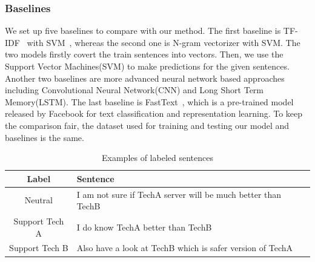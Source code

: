 \subsubsection{Baselines}
We set up five baselines to compare with our method. 
The first baseline is TF-IDF~\cite{sparck1972statistical} with SVM~\cite{Cortes1995}, whereas the second one is N-gram vectorizer with SVM. 
The two models firstly covert the train sentences into vectors. 
Then, we use the Support Vector Machines(SVM) to make predictions for the given sentences. 
Another two baselines are more advanced neural network based approaches including Convolutional Neural Network(CNN) and Long Short Term Memory(LSTM). 
The last baseline is FastText~\cite{joulin2016fasttext}, which is a pre-trained model released by Facebook for text classification and representation learning.
To keep the comparison fair, the dataset used for training and testing our model and baselines is the same.

\begin{table}
	\scriptsize
	\center	
	\caption{Examples of labeled sentences }
	\vspace{-4mm}
	\begin{tabular}{c |l}
		\hline
		\textbf{Label} & \textbf{Sentence} \\
		\hline
        \multirow{1}{*}{Neutral} & I am not sure if TechA server will be much better than TechB\\
        \hline
        \multirow{1}{*}{Support Tech A} & I do know TechA better than TechB\\
        \hline
        \multirow{1}{*}{Support Tech B} & Also have a look at TechB which is safer version of TechA\\
				\hline
	\end{tabular}
	\vspace{-3mm}
	\label{tab:label}
\end{table}
